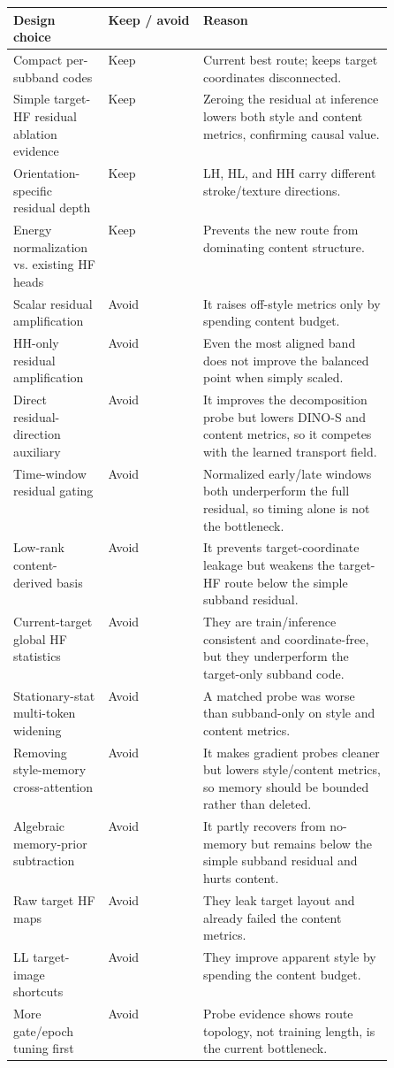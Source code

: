 \documentclass[10pt,twocolumn]{article}
\begin{document}
\begin{center}
\footnotesize
\begin{tabularx}{\linewidth}{p{0.25\linewidth}p{0.25\linewidth}X}
\toprule
Design choice & Keep / avoid & Reason \\
\midrule
Compact per-subband codes & Keep & Current best route; keeps target coordinates disconnected. \\
Simple target-HF residual ablation evidence & Keep & Zeroing the residual at inference lowers both style and content metrics, confirming causal value. \\
Orientation-specific residual depth & Keep & LH, HL, and HH carry different stroke/texture directions. \\
Energy normalization vs. existing HF heads & Keep & Prevents the new route from dominating content structure. \\
Scalar residual amplification & Avoid & It raises off-style metrics only by spending content budget. \\
HH-only residual amplification & Avoid & Even the most aligned band does not improve the balanced point when simply scaled. \\
Direct residual-direction auxiliary & Avoid & It improves the decomposition probe but lowers DINO-S and content metrics, so it competes with the learned transport field. \\
Time-window residual gating & Avoid & Normalized early/late windows both underperform the full residual, so timing alone is not the bottleneck. \\
Low-rank content-derived basis & Avoid & It prevents target-coordinate leakage but weakens the target-HF route below the simple subband residual. \\
Current-target global HF statistics & Avoid & They are train/inference consistent and coordinate-free, but they underperform the target-only subband code. \\
Stationary-stat multi-token widening & Avoid & A matched probe was worse than subband-only on style and content metrics. \\
Removing style-memory cross-attention & Avoid & It makes gradient probes cleaner but lowers style/content metrics, so memory should be bounded rather than deleted. \\
Algebraic memory-prior subtraction & Avoid & It partly recovers from no-memory but remains below the simple subband residual and hurts content. \\
Raw target HF maps & Avoid & They leak target layout and already failed the content metrics. \\
LL target-image shortcuts & Avoid & They improve apparent style by spending the content budget. \\
More gate/epoch tuning first & Avoid & Probe evidence shows route topology, not training length, is the current bottleneck. \\
\bottomrule
\end{tabularx}
\normalsize
\end{center}
\end{document}
